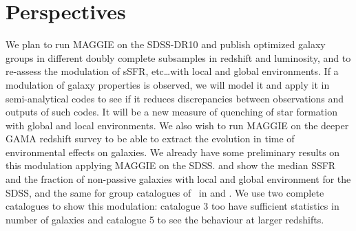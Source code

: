 \section{Perspectives}
\label{sec:perspectives}

We plan to run MAGGIE on the SDSS-DR10 and publish optimized galaxy groups in
different doubly complete subsamples in redshift and luminosity, and to
re-assess the modulation of sSFR, etc\ldots with local and global environments.
If a modulation of galaxy properties is observed, we will model it and apply it
in semi-analytical codes to see if it reduces discrepancies between
observations and outputs of such codes. It will be a new measure of quenching
of star formation with global and local environments. We also wish to run
MAGGIE on the deeper GAMA redshift survey to be able to extract the evolution
in time of environmental effects on galaxies. We already have some preliminary
results on this modulation applying MAGGIE on the SDSS\@.
 and  show the median
SSFR and the fraction of non-passive galaxies with local and global environment
for the SDSS, and the same for group catalogues of~\cite{Tempel+14} in
 and . We
use two complete catalogues to show this modulation: catalogue 3 too have
sufficient statistics in number of galaxies and catalogue 5 to see the
behaviour at larger redshifts.

